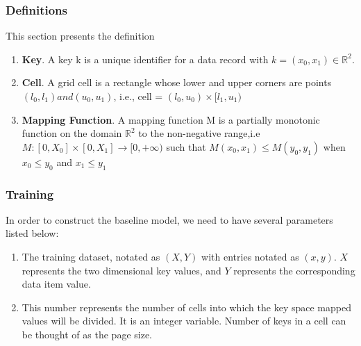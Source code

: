 \subsubsection{Definitions}

This section presents the definition

\begin{enumerate}
	\item \textbf{Key}. A key k is a unique identifier for a data record with $k = (x_{0}, x_{1}) \in \mathbb{R}^{2}$. 
    
	\item \textbf{Cell}. A grid cell is a rectangle whose lower and upper corners are points $(l_{0},l_{1}) and  (u_{0},u_{1})$, i.e.,  cell = $(l_{0},u_{0}) \times [l_{1},u_{1})$
	
	\item \textbf{Mapping Function}. A mapping function M is a partially monotonic function on the domain $\mathbb{R}^{2}$ to the non-negative range,i.e $M:[0,X_{0}]\times[0,X_{1}]\to [0,+\infty)$ such that $M(x_{0},x_{1}) \leq M(y_{0},y_{1})$ when $x_{0} \leq y_{0}$ and $x_{1} \leq y_{1} $
	
    

\end{enumerate}


\subsubsection{Training}

In order to construct the baseline model, we need to have several parameters listed below:
\begin{enumerate}
	\item The training dataset, notated as $(X, Y)$ with entries notated as $(x,y)$. $X$ represents the two dimensional key values, and $Y$ represents the corresponding data item value. 
	\item This number represents the number of cells into which the key space mapped values will be divided. It is an integer variable. Number of keys in a cell can be thought of as the page size.  
\end{enumerate}

